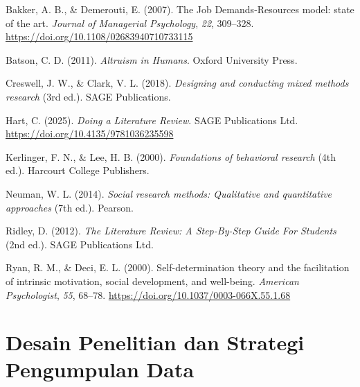 \documentclass[
  indonesian,
  letterpaper,
  DIV=11,
  numbers=noendperiod]{scrreprt}
\newlength{\cslhangindent}
\newenvironment{CSLReferences}[2] %
 {\begin{list}{}{%
  \setlength{\itemindent}{0pt}
  \setlength{\leftmargin}{0pt}
  \setlength{\parsep}{0pt}
  \ifodd #1
   \setlength{\leftmargin}{\cslhangindent}
   \setlength{\itemindent}{-1\cslhangindent}
  \fi
  \setlength{\itemsep}{#2\baselineskip}}}
 {\end{list}}
\begin{document}
\label{refs--4}
\begin{CSLReferences}{1}{0}
Bakker, A. B., \& Demerouti, E. (2007). The Job Demands‐Resources model:
state of the art. \emph{Journal of Managerial Psychology}, \emph{22},
309--328. \url{https://doi.org/10.1108/02683940710733115}

Batson, C. D. (2011). \emph{Altruism in Humans}. Oxford University
Press.

Creswell, J. W., \& Clark, V. L. (2018). \emph{Designing and conducting
mixed methods research} (3rd ed.). SAGE Publications.

Hart, C. (2025). \emph{Doing a Literature Review}. SAGE Publications
Ltd. \url{https://doi.org/10.4135/9781036235598}

Kerlinger, F. N., \& Lee, H. B. (2000). \emph{Foundations of behavioral
research} (4th ed.). Harcourt College Publishers.

Neuman, W. L. (2014). \emph{Social research methods: Qualitative and
quantitative approaches} (7th ed.). Pearson.

Ridley, D. (2012). \emph{The Literature Review: A Step-By-Step Guide For
Students} (2nd ed.). SAGE Publications Ltd.

Ryan, R. M., \& Deci, E. L. (2000). Self-determination theory and the
facilitation of intrinsic motivation, social development, and
well-being. \emph{American Psychologist}, \emph{55}, 68--78.
\url{https://doi.org/10.1037/0003-066X.55.1.68}

\end{CSLReferences}

\chapter{Desain Penelitian dan Strategi Pengumpulan
Data}\label{sec-desain}
\end{document}
